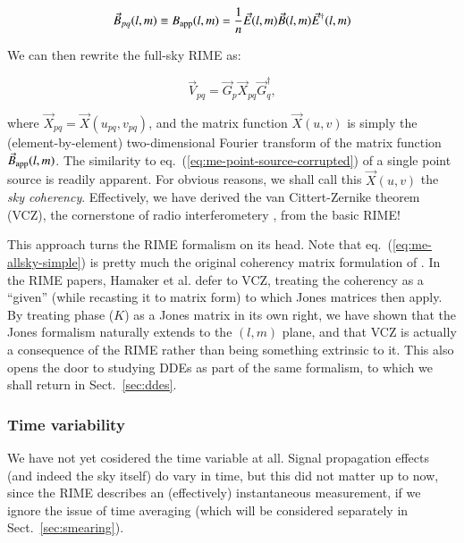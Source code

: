 \documentclass[]{aa}
\begin{document}
  \[
  \vec B_{pq}(l,m) \equiv B_{\rm app}(l,m) =  \frac{1}{n} \vec E(l,m) \vec B(l,m) \vec E^\dagger(l,m)
  \]

We can then rewrite the full-sky RIME as:

\begin{equation}\label{eq:me-allsky-simple}
\vec V_{pq} = \vec G_p \vec X_{pq} \vec G^\dagger_q,
\end{equation}

where $\vec X_{pq} = \vec X(u_{pq},v_{pq})$, and the matrix function $\vec X(u,v)$ is simply the (element-by-element) two-dimensional Fourier transform of the matrix function $\vec B_{\rm app}(l,m)$. The similarity to eq.~(\ref{eq:me-point-source-corrupted}) of a single point source is readily apparent. For obvious reasons, we shall call this $\vec X(u,v)$ the {\em sky coherency}. Effectively, we have derived the van Cittert-Zernike theorem (VCZ), the cornerstone of radio interferometery \citep[Sect.~14.1]{tms}, from the basic RIME! 

This approach turns the RIME formalism on its head. Note that eq.~(\ref{eq:me-allsky-simple}) is pretty much the original coherency matrix formulation of \citet[eq.~2]{ME4}. In the RIME papers, Hamaker et al. defer to VCZ, treating the coherency as a ``given'' (while recasting it to matrix form) to which Jones matrices then apply. By treating phase ($K$) as a Jones matrix in its own right, we have shown that the Jones formalism naturally extends to the $(l,m)$ plane, and that VCZ is actually a consequence of the RIME rather than being something extrinsic to it. This also opens the door to studying DDEs as part of the same formalism, to which we shall return in Sect.~\ref{sec:ddes}.

\subsubsection{Time variability}

We have not yet cosidered the time variable at all. Signal propagation effects (and indeed the sky itself) do vary in time, but this did not matter up to now, since the RIME describes an (effectively) instantaneous measurement, if we ignore the issue of time averaging (which will be considered separately in Sect.~\ref{sec:smearing}). 
\end{document}
